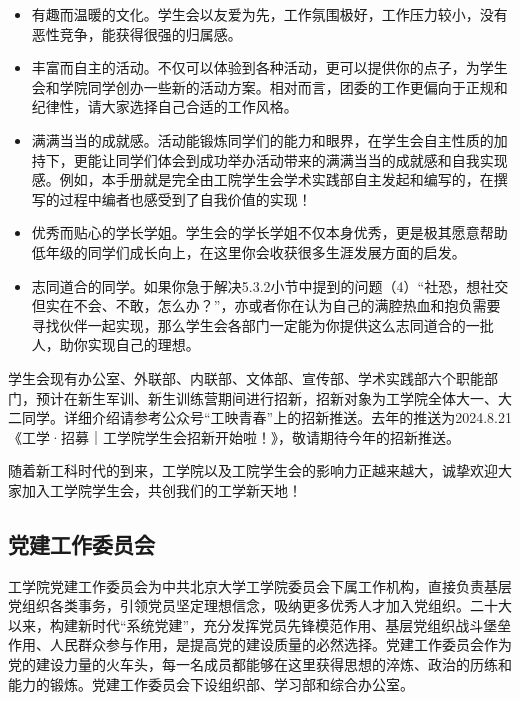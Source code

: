 \documentclass[11pt,oneside]{book}
\begin{document}
\begin{itemize}
    \item 有趣而温暖的文化。学生会以友爱为先，工作氛围极好，工作压力较小，没有恶性竞争，能获得很强的归属感。
    
    \item 丰富而自主的活动。不仅可以体验到各种活动，更可以提供你的点子，为学生会和学院同学创办一些新的活动方案。相对而言，团委的工作更偏向于正规和纪律性，请大家选择自己合适的工作风格。
    
    \item 满满当当的成就感。活动能锻炼同学们的能力和眼界，在学生会自主性质的加持下，更能让同学们体会到成功举办活动带来的满满当当的成就感和自我实现感。例如，本手册就是完全由工院学生会学术实践部自主发起和编写的，在撰写的过程中编者也感受到了自我价值的实现！
    
    \item 优秀而贴心的学长学姐。学生会的学长学姐不仅本身优秀，更是极其愿意帮助低年级的同学们成长向上，在这里你会收获很多生涯发展方面的启发。
    
    \item 志同道合的同学。如果你急于解决5.3.2小节中提到的问题（4）“社恐，想社交但实在不会、不敢，怎么办？”，亦或者你在认为自己的满腔热血和抱负需要寻找伙伴一起实现，那么学生会各部门一定能为你提供这么志同道合的一批人，助你实现自己的理想。
\end{itemize}

\vspace{10pt}

学生会现有办公室、外联部、内联部、文体部、宣传部、学术实践部六个职能部门，预计在新生军训、新生训练营期间进行招新，招新对象为工学院全体大一、大二同学。详细介绍请参考公众号“工映青春”上的招新推送。去年的推送为2024.8.21《工学·招募｜工学院学生会招新开始啦！》，敬请期待今年的招新推送。

\vspace{10pt}

随着新工科时代的到来，工学院以及工院学生会的影响力正越来越大，诚挚欢迎大家加入工学院学生会，共创我们的工学新天地！

\vspace{10pt}


\subsection{党建工作委员会}

工学院党建工作委员会为中共北京大学工学院委员会下属工作机构，直接负责基层党组织各类事务，引领党员坚定理想信念，吸纳更多优秀人才加入党组织。二十大以来，构建新时代“系统党建”，充分发挥党员先锋模范作用、基层党组织战斗堡垒作用、人民群众参与作用，是提高党的建设质量的必然选择。党建工作委员会作为党的建设力量的火车头，每一名成员都能够在这里获得思想的淬炼、政治的历练和能力的锻炼。党建工作委员会下设组织部、学习部和综合办公室。
\end{document}
